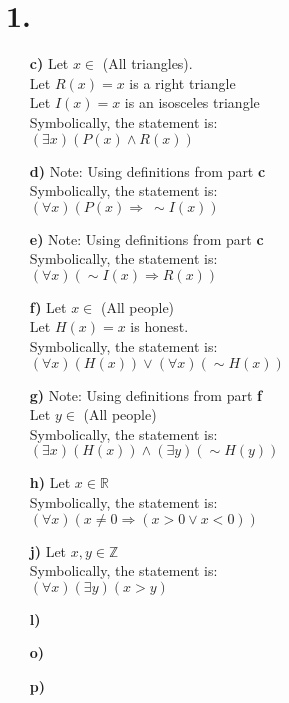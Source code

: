 \documentclass[12pt,letterpaper]{article}
\begin{document}
\section*{1.}


\begin{enumerate}[label= \textbf{\alph*)}]
	\item[\textbf{c)}] Let $x \in $ (All triangles).\\
						Let $R(x) = x$ is a right triangle\\
						Let $I(x) = x$ is an isosceles triangle\\
						Symbolically, the statement is:\\
						$(\exists x) (P(x) \land R(x))$ 
	\item[\textbf{d)}] Note: Using definitions from part \textbf{c}\\
						Symbolically, the statement is:\\
						$(\forall x) (P(x) \Rightarrow\ \sim I(x))$
	\item[\textbf{e)}] Note: Using definitions from part \textbf{c}\\
						Symbolically, the statement is:\\
						$(\forall x) (\sim I(x) \Rightarrow R(x))$ 
	\item[\textbf{f)}]  Let $x \in$ (All people)\\
						Let $H(x) = x$ is honest.\\
						Symbolically, the statement is:\\
						$(\forall x)(H(x)) \lor (\forall x)(\sim H(x))$ 
	\item[\textbf{g)}] Note: Using definitions from part \textbf{f}\\
						Let $y \in$ (All people)\\ 
						Symbolically, the statement is:\\
						$(\exists x)(H(x)) \land (\exists y)(\sim H(y))$
	\item[\textbf{h)}] Let $x \in \mathbb{R}$\\
						Symbolically, the statement is:\\
						$(\forall x)(x \neq 0 \Rightarrow (x > 0 \lor x < 0))$ 
	\item[\textbf{j)}] Let $x, y \in \mathbb{Z}$\\
						Symbolically, the statement is:\\
						$(\forall x)(\exists y)(x > y)$ 
	\item[\textbf{l)}] 
	\item[\textbf{o)}]
	\item[\textbf{p)}] 
\end{enumerate}
\end{document}

